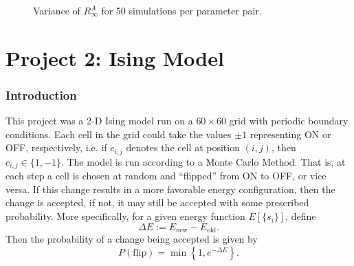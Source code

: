 \documentclass[12pt,letterpaper,cm]{article}
\renewcommand{\.}{\cdot}
\newcommand{\<}{\langle}
\renewcommand{\>}{\rangle}
\begin{document}
	\begin{figure}[hbt]
		\centering
		
		\caption{Variance of $R_\infty^A$ for 50 simulations per parameter pair.}
		\label{fig:FastVar}
		
	\end{figure}
	
	
	
	\newpage
	
	
	
	\part*{Project 2: Ising Model}
	
	
	\section*{Introduction}
	
	This project was a 2-D Ising model run on a $60\times 60$ grid with periodic boundary conditions. Each cell in the grid could take the values $\pm 1$ representing ON or OFF, respectively, i.e. if $c_{i,j}$ denotes the cell at position $(i,j)$, then $c_{i,j} \in \{1, -1\}$.	The model is run according to a Monte Carlo Method. That is, at each step a cell is chosen at random and ``flipped'' from ON to OFF, or vice versa. If this change results in a more favorable energy configuration, then the change is accepted, if not, it may still be accepted with some prescribed probability. More specifically, for a given energy function $E[\{s_i \}]$, define 
	\[\Delta E := E_{\text{new}} - E_{\text{old}}. \]
	Then the probability of a change being accepted is given by
	\[P(\text{flip}) = \min\left\{1, e^{-\Delta E} \right\}. \]
	
\end{document}
